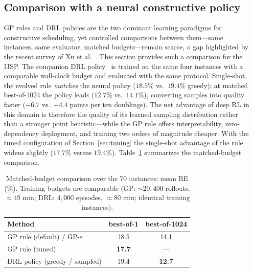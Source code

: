 \subsection{Comparison with a neural constructive policy}
\label{sec:vs-rl}
GP rules and DRL policies are the two dominant learning paradigms for
constructive scheduling, yet controlled comparisons between them---same
instances, same evaluator, matched budgets---remain scarce, a gap
highlighted by the recent survey of Xu et al.~\cite{Xu2025}. This section
provides such a comparison for the IJSP. The companion DRL
policy~\cite{DiazRL2026} is trained on the same four
instances with a comparable wall-clock budget and evaluated with the same
protocol. Single-shot, the evolved rule \emph{matches} the neural policy
($18.5\%$ vs.\ $19.4\%$ greedy); at matched best-of-1024 the policy leads
($12.7\%$ vs.\ $14.1\%$), converting samples into quality faster
($-6.7$ vs.\ $-4.4$ points per ten doublings). The net advantage of deep
RL in this domain is therefore the quality of its learned sampling
distribution rather than a stronger point heuristic---while the GP rule
offers interpretability, zero-dependency deployment, and training two
orders of magnitude cheaper. With the tuned configuration of
Section~\ref{sec:tuning} the single-shot advantage of the rule widens
slightly ($17.7\%$ versus $19.4\%$). Table~\ref{tab:matched} summarizes
the matched-budget comparison.

\begin{table}[t]
\centering\small
\caption{Matched-budget comparison over the 70 instances: mean RE (\%).
Training budgets are comparable (GP: ${\sim}20{,}400$ rollouts,
${\approx}49$ min; DRL: $4{,}000$ episodes, ${\approx}80$ min; identical
training instances).}
\label{tab:matched}
\begin{tabular}{lcc}
\toprule
Method & best-of-1 & best-of-1024 \\
\midrule
GP rule (default) / GP-$\varepsilon$ & 18.5 & 14.1 \\
GP rule (tuned) & \textbf{17.7} & --- \\
DRL policy (greedy / sampled) & 19.4 & \textbf{12.7} \\
\bottomrule
\end{tabular}
\end{table}


